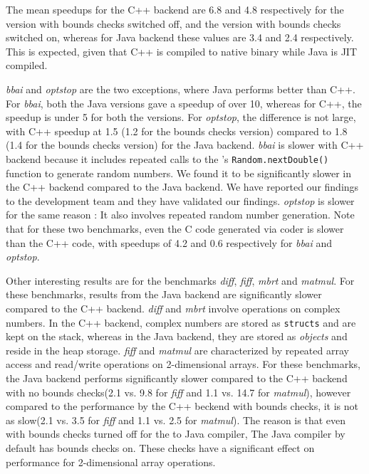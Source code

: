 The mean speedups for the C++ backend are 6.8 and 4.8 respectively for the
version with bounds checks switched off, and the version with bounds checks
switched on, whereas for Java backend these values are 3.4 and 2.4
respectively. This is expected, given that C++ is compiled to native binary
while Java is JIT compiled. 

\emph{bbai} and \emph{optstop} are the two exceptions, where Java performs
better than C++.  For \emph{bbai}, both the Java versions gave a speedup of
over 10, whereas for C++, the speedup is under 5 for both the versions. For
\emph{optstop}, the difference is not large, with C++ speedup at 1.5 (1.2 for
the bounds checks version) compared to 1.8 (1.4 for the bounds checks
version) for the Java backend. \emph{bbai} is slower with \xten C++ backend
because it includes repeated calls to the \xten's \texttt{Random.nextDouble()}
function to generate random numbers. We found it to be significantly slower in
the C++ backend compared to the Java backend. We have reported our findings to
the \xten development team and they have validated our findings. \emph{optstop}
is slower for the same reason : It also involves repeated random number
generation. Note that for these two benchmarks, even the C code generated via
\matlab coder is slower than the C++ code, with speedups of 4.2 and 0.6
respectively for \emph{bbai} and \emph{optstop}. 

Other interesting results are for the benchmarks \emph{diff}, \emph{fiff},
\emph{mbrt} and \emph{matmul}. For these benchmarks, results from the Java
backend are significantly slower compared to the C++ backend.  \emph{diff} and
\emph{mbrt} involve operations on complex numbers. In the \xten C++ backend,
complex numbers are stored as \texttt{structs} and are kept on the stack,
whereas in the Java backend, they are stored as \emph{objects} and reside in
the heap storage.  \emph{fiff} and \emph{matmul}  are characterized by repeated
array access and read/write operations on 2-dimensional arrays.  For these
benchmarks, the Java backend performs significantly slower compared to the C++
backend with no bounds checks(2.1 vs. 9.8 for \emph{fiff} and 1.1 vs.  14.7
for \emph{matmul}), however compared to the performance by the C++ beckend with
bounds checks, it is not as slow(2.1 vs. 3.5 for \emph{fiff} and 1.1 vs.
2.5 for \emph{matmul}).  The reason is that even with bounds checks turned off
for the \xten to Java compiler, The Java compiler by default has bounds checks
on. These checks have a significant effect on performance for 2-dimensional
array operations.

